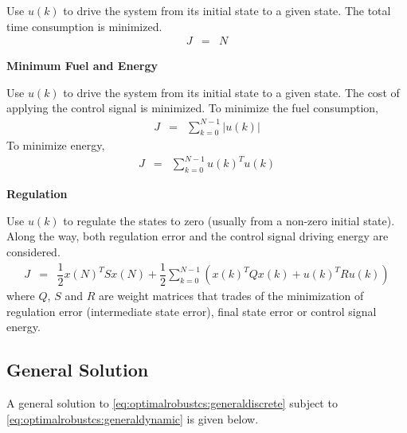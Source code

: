 Use $u(k)$ to drive the system from its initial state to a given state. The total time consumption is minimized.
\begin{eqnarray}
  J &=& N \nonumber
\end{eqnarray}

\vspace{0.1in}
\noindent \textbf{Minimum Fuel and Energy}
\vspace{0.1in}

Use $u(k)$ to drive the system from its initial state to a given state. The cost of applying the control signal is minimized. To minimize the fuel consumption,
\begin{eqnarray}
  J &=& \sum_{k=0}^{N-1} |u(k)| \nonumber
\end{eqnarray}
To minimize energy,
\begin{eqnarray}
  J &=& \sum_{k=0}^{N-1} u(k)^Tu(k) \nonumber
\end{eqnarray}

\vspace{0.1in}
\noindent \textbf{Regulation}
\vspace{0.1in}

Use $u(k)$ to regulate the states to zero (usually from a non-zero initial state). Along the way, both regulation error and the control signal driving energy are considered.
\begin{eqnarray}
  J &=& \dfrac{1}{2}x(N)^TSx(N) + \dfrac{1}{2}\sum_{k=0}^{N-1}\left(x(k)^TQx(k) + u(k)^TRu(k)\right) \nonumber
\end{eqnarray}
where $Q$, $S$ and $R$ are weight matrices that trades of the minimization of regulation error (intermediate state error), final state error or control signal energy.

\subsection{General Solution} \label{subsec:optimalrobustcs:optimalgeneralsolution}

A general solution to \eqref{eq:optimalrobustcs:generaldiscrete} subject to \eqref{eq:optimalrobustcs:generaldynamic} is given below.

